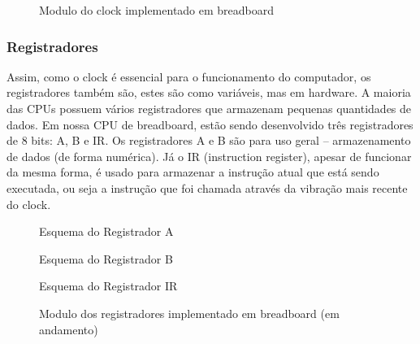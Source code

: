 \vspace{1cm}
\begin{figure}[H] \centering 
  \caption{\label{module_clock} Modulo do clock implementado em breadboard} 
\end{figure}

\subsubsection{Registradores}
Assim, como o clock é essencial para o funcionamento do computador, os registradores também são, estes são como variáveis, mas em hardware. A maioria das CPUs possuem vários registradores que armazenam pequenas quantidades de dados. Em nossa CPU de breadboard, estão sendo desenvolvido três registradores de 8 bits: A, B e IR. Os registradores A e B são para uso geral – armazenamento de dados (de forma numérica). Já o IR (instruction register), apesar de funcionar da mesma forma, é usado para armazenar a instrução atual que está sendo executada, ou seja a instrução que foi chamada através da vibração mais recente do clock.

\vspace{1cm}
\begin{figure}[H] \centering 
  \caption{\label{schematics_a_register} Esquema do Registrador A} 
\end{figure}

\vspace{1cm}
\begin{figure}[H] \centering 
  \caption{\label{schematics_b_register} Esquema do Registrador B} 
\end{figure}

\vspace{1cm}
\begin{figure}[H] \centering 
  \caption{\label{schematics_ir} Esquema do Registrador IR} 
\end{figure}

\vspace{1cm}
\begin{figure}[H] \centering 
  \caption{\label{module_register} Modulo dos registradores implementado em breadboard (em andamento)} 
\end{figure}

